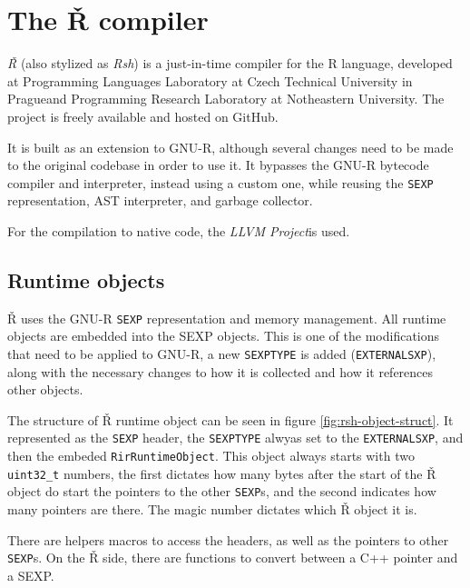 \section{The Ř compiler}

\textit{Ř} (also stylized as \textit{Rsh}) is a just-in-time compiler for the R language, developed at Programming Languages Laboratory at Czech Technical University in Prague\todocite and Programming Research Laboratory at Notheastern University\todocite. The project is freely available and hosted on GitHub.

It is built as an extension to GNU-R, although several changes need to be made to the original codebase in order to use it. It bypasses the GNU-R bytecode compiler and interpreter, instead using a custom one, while reusing the \texttt{SEXP} representation, AST interpreter, and garbage collector.

For the compilation to native code, the \textit{LLVM Project}\todocite is used.


\subsection{Runtime objects}

Ř uses the GNU-R \texttt{SEXP} representation and memory management. All runtime objects are embedded into the SEXP objects. This is one of the modifications that need to be applied to GNU-R, a new \texttt{SEXPTYPE} is added (\texttt{EXTERNALSXP}), along with the necessary changes to how it is collected and how it references other objects.

The structure of Ř runtime object can be seen in figure \ref{fig:rsh-object-struct}. It represented as the \texttt{SEXP} header, the \texttt{SEXPTYPE} alwyas set to the \texttt{EXTERNALSXP}, and then the embeded \texttt{RirRuntimeObject}. This object always starts with two \texttt{uint32\_t} numbers, the first dictates how many bytes after the start of the Ř object do start the pointers to the other \texttt{SEXP}s, and the second indicates how many pointers are there. The magic number dictates which Ř object it is.

There are helpers macros to access the headers, as well as the pointers to other \texttt{SEXP}s. On the Ř side, there are functions to convert between a C++ pointer and a SEXP.


